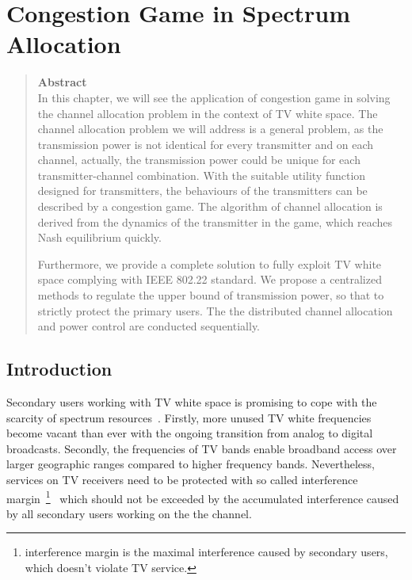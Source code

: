\chapter{Congestion Game in Spectrum Allocation}
\begin{quote}
{\textbf{Abstract}\\
\small In this chapter, we will see the application of congestion game in solving the channel allocation problem in the context of TV white space.
The channel allocation problem we will address is a general problem, as the transmission power is not identical for every transmitter and on each channel, actually, the transmission power could be unique for each transmitter-channel combination.
With the suitable utility function designed for transmitters, the behaviours of the transmitters can be described by a congestion game.
The algorithm of channel allocation is derived from the dynamics of the transmitter in the game, which reaches Nash equilibrium quickly.

Furthermore, we provide a complete solution to fully exploit TV white space complying with IEEE 802.22 standard.
We propose a centralized methods to regulate the upper bound of transmission power, so that to strictly protect the primary users.
The the distributed channel allocation and power control are conducted sequentially.
}
\end{quote}

\section{Introduction}




Secondary users working with TV white space is promising to cope with the scarcity of spectrum resources~\cite{FCC_2010_sedond_memorandumm}. 
Firstly, more unused TV white frequencies become vacant than ever with the ongoing transition from analog to digital broadcasts. Secondly, the frequencies of TV bands enable broadband access over larger geographic ranges compared to higher frequency bands. Nevertheless, services on TV receivers need to be protected with so called interference margin~\footnote{interference margin is the maximal interference caused by secondary users, which doesn't violate TV service.}~\cite{multipleIntf_pimrc11} which should not be exceeded by the accumulated interference caused by all secondary users working on the the channel.

